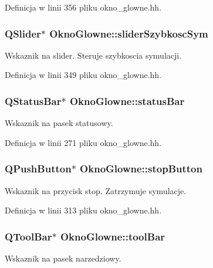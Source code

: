 Definicja w linii 356 pliku okno\-\_\-glowne.\-hh.

\hypertarget{class_okno_glowne_a85328893065393400d5a0344004ca78b}{
\subsubsection[{slider\-Szybkosc\-Sym}]{\setlength{\rightskip}{0pt plus 5cm}Q\-Slider$\ast$ Okno\-Glowne\-::slider\-Szybkosc\-Sym\hspace{0.3cm}{\ttfamily [private]}}}\label{class_okno_glowne_a85328893065393400d5a0344004ca78b}
Wskaznik na slider. Steruje szybkoscia symulacji. 

Definicja w linii 349 pliku okno\-\_\-glowne.\-hh.

\hypertarget{class_okno_glowne_a40a10989bc6b318ac24e2457d7adb53b}{
\subsubsection[{status\-Bar}]{\setlength{\rightskip}{0pt plus 5cm}Q\-Status\-Bar$\ast$ Okno\-Glowne\-::status\-Bar\hspace{0.3cm}{\ttfamily [private]}}}\label{class_okno_glowne_a40a10989bc6b318ac24e2457d7adb53b}
Wskaznik na pasek statusowy. 

Definicja w linii 271 pliku okno\-\_\-glowne.\-hh.

\hypertarget{class_okno_glowne_a3051d73dc0e0a27dc30ada43cc6b63c4}{
\subsubsection[{stop\-Button}]{\setlength{\rightskip}{0pt plus 5cm}Q\-Push\-Button$\ast$ Okno\-Glowne\-::stop\-Button\hspace{0.3cm}{\ttfamily [private]}}}\label{class_okno_glowne_a3051d73dc0e0a27dc30ada43cc6b63c4}
Wskaznik na przycisk stop. Zatrzymuje symulacje. 

Definicja w linii 313 pliku okno\-\_\-glowne.\-hh.

\hypertarget{class_okno_glowne_a6a37dd1f32605092fff7feac712bf429}{
\subsubsection[{tool\-Bar}]{\setlength{\rightskip}{0pt plus 5cm}Q\-Tool\-Bar$\ast$ Okno\-Glowne\-::tool\-Bar\hspace{0.3cm}{\ttfamily [private]}}}\label{class_okno_glowne_a6a37dd1f32605092fff7feac712bf429}
Wskaznik na pasek narzedziowy. 

